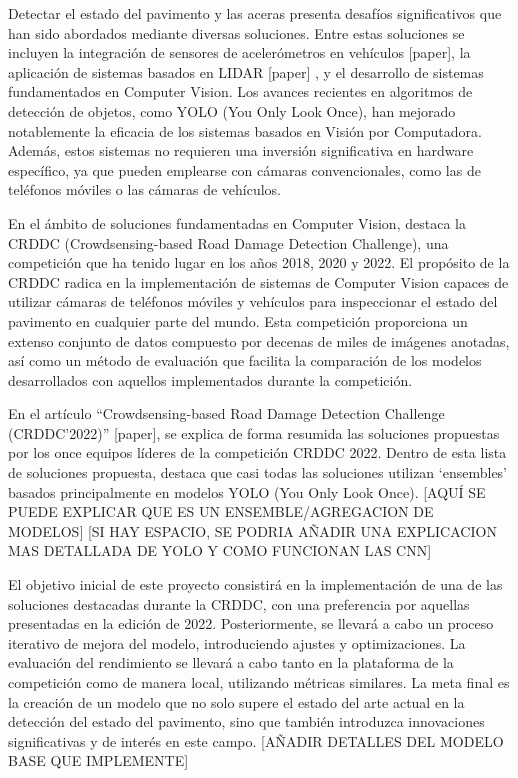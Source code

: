Detectar el estado del pavimento y las aceras presenta desafíos significativos que han sido
abordados mediante diversas soluciones. Entre estas soluciones se incluyen la integración de
sensores de acelerómetros en vehículos [paper], la aplicación de sistemas basados en LIDAR
[paper] , y el desarrollo de sistemas fundamentados en Computer Vision. Los avances
recientes en algoritmos de detección de objetos, como YOLO (You Only Look Once), han
mejorado notablemente la eficacia de los sistemas basados en Visión por Computadora.
Además, estos sistemas no requieren una inversión significativa en hardware específico, ya
que pueden emplearse con cámaras convencionales, como las de teléfonos móviles o las
cámaras de vehículos.

En el ámbito de soluciones fundamentadas en Computer Vision, destaca la CRDDC
(Crowdsensing-based Road Damage Detection Challenge), una competición que ha tenido
lugar en los años 2018, 2020 y 2022. El propósito de la CRDDC radica en la implementación
de sistemas de Computer Vision capaces de utilizar cámaras de teléfonos móviles y vehículos
para inspeccionar el estado del pavimento en cualquier parte del mundo. Esta competición
proporciona un extenso conjunto de datos compuesto por decenas de miles de imágenes
anotadas, así como un método de evaluación que facilita la comparación de los modelos
desarrollados con aquellos implementados durante la competición.

En el artículo “Crowdsensing-based Road Damage Detection Challenge (CRDDC’2022)”
[paper], se explica de forma resumida las soluciones propuestas por los once equipos líderes
de la competición CRDDC 2022. Dentro de esta lista de soluciones propuesta, destaca que
casi todas las soluciones utilizan ‘ensembles’ basados principalmente en modelos YOLO (You
Only Look Once).
[AQUÍ SE PUEDE EXPLICAR QUE ES UN ENSEMBLE/AGREGACION DE MODELOS]
[SI HAY ESPACIO, SE PODRIA AÑADIR UNA EXPLICACION MAS DETALLADA DE YOLO Y COMO
FUNCIONAN LAS CNN]

El objetivo inicial de este proyecto consistirá en la implementación de una de las soluciones
destacadas durante la CRDDC, con una preferencia por aquellas presentadas en la edición de
2022. Posteriormente, se llevará a cabo un proceso iterativo de mejora del modelo,
introduciendo ajustes y optimizaciones. La evaluación del rendimiento se llevará a cabo
tanto en la plataforma de la competición como de manera local, utilizando métricas
similares. La meta final es la creación de un modelo que no solo supere el estado del arte
actual en la detección del estado del pavimento, sino que también introduzca innovaciones
significativas y de interés en este campo.
[AÑADIR DETALLES DEL MODELO BASE QUE IMPLEMENTE]
